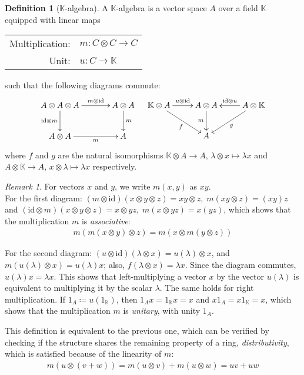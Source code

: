 \documentclass[svgnames]{article}
\theoremstyle{definition}
\newtheorem{Definition}{Definition}
\theoremstyle{remark}
\newtheorem*{Remark*}{Remark}
\theoremstyle{underline}
\theoremstyle{underline}
\newcommand{\id}{\mathrm{id}}
\begin{document}
	\begin{Definition}[$\mathbb K$-algebra]
		A $\mathbb K$-algebra is a vector space $A$ over a field $\mathbb K$ equipped with linear maps 
		\begin{center}
			\begin{tabular}{rl}
		 		Multiplication: & $m \colon C \otimes C \rightarrow C$ \\
		 		Unit: & $ u \colon C \rightarrow \mathbb K$ 
			\end{tabular}
		\end{center} such that the following diagrams commute:
		\begin{align*}
		\xymatrix@!C{
			A \otimes A \otimes A \ar[d]_-{\id \otimes m} \ar[r]^-{m \otimes \id} & A \otimes A \ar[d]^-{m} \\
			A \otimes A \ar[r]_-{m} & A
		} & &
		\xymatrix@!C{
			\mathbb K \otimes A \ar[r]^-{u \otimes \id} \ar[dr]_-{f} & A \otimes A \ar[d]_-{m} & A \otimes \mathbb K \ar[l]_-{\id \otimes u} \ar[dl]^-{g} \\
			& A &	
		}
		\end{align*}
		where $f$ and $g$ are the natural isomorphisms $\mathbb K \otimes A \to A$, $\lambda \otimes x \mapsto \lambda x$ and $A \otimes \mathbb K \to A$, $x \otimes \lambda \mapsto \lambda x$ respectively.
	\end{Definition}
	
	\begin{Remark*} For vectors $x$ and $y$, we write $m(x, y)$ as $xy$.\\
		For the first diagram: $(m \otimes \id)(x \otimes y \otimes z) = xy \otimes z,\; m(xy \otimes z) = (xy)z $ and $(\id \otimes m)(x \otimes y \otimes z) = x \otimes y z,\; m(x \otimes yz) = x(yz)$, which shows that the multiplication $m$ is \emph{associative}:
		\begin{gather*}
		m(m(x \otimes y) \otimes z) = m(x \otimes m(y \otimes z))
		\end{gather*}
		
		For the second diagram: $(u \otimes \id) (\lambda \otimes x) = u(\lambda) \otimes x$, and $m(u(\lambda) \otimes x) = u(\lambda) x$; also, $f(\lambda \otimes x) = \lambda x$. Since the diagram commutes, $u(\lambda) x = \lambda x$. This shows that left-multiplying a vector $x$ by the vector $u(\lambda)$ is equivalent to multiplying it by the scalar $\lambda$. The same holds for right multiplication. If $1_A \coloneqq u(1_{\mathbb K})$, then $1_A x = 1_{\mathbb K} x = x$ and $x 1_A = x 1_{\mathbb K} = x$, which shows that the multiplication $m$ is \emph{unitary}, with unity $1_A$.
		
		This definition is equivalent to the previous one, which can be verified by checking if the structure shares the remaining property of a ring, \emph{distributivity}, which is satisfied because of the linearity of $m$:
		\begin{gather*}
		m(u \otimes (v + w)) = m(u \otimes v) + m(u \otimes w) = uv + uw
		\end{gather*}
	\end{Remark*}
	
\end{document}

